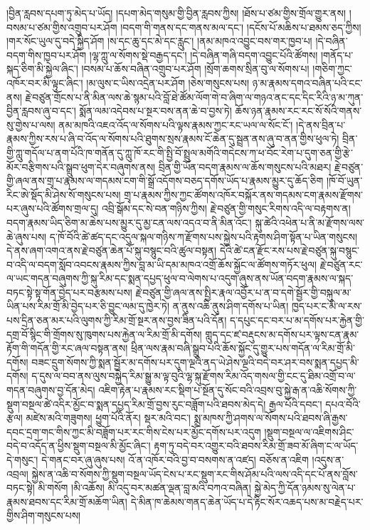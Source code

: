 \documentclass{article}
\begin{document}
།བྱིན་རླབས་དཔག་ཏུ་མེད་པ་ཡོད། །དཔག་མེད་གསུམ་གྱི་བྱིན་རླབས་ཀྱིས། །ཐོས་པ་ཙམ་གྱིས་གྲོལ་གྱུར་ནས། །བསམ་པ་ཙམ་གྱིས་འགྲུབ་པར་ཤོག །བདག་གི་གནས་དང་གནས་མལ་དང་། །དངོས་པོ་མཆིས་པ་ཐམས་ཅད་ཀྱིས། །གར་སོང་ཡུལ་དུ་བདེ་སྐྱིད་ཤོག །ས་དང་ཆུ་དང་མེ་དང་རླུང་། །ནམ་མཁའ་འབྱུང་བས་གར་ཁྱབ་པ། །དེ་བཞིན་བདག་གིས་ཁྱབ་པར་ཤོག །ལྷ་ཀླུ་ལ་སོགས་སྡེ་བརྒྱད་དང་། །དེ་བཞིན་གཞི་བདག་འབྱུང་པོའི་ཚོགས། །གནོད་པ་སྐད་ཅིག་མི་སྐྱེལ་ཞིང་། །བསམ་པ་ཆོས་བཞིན་འགྲུབ་པར་ཤོག །སྲོག་ཆགས་སྲིན་བུ་ལ་སོགས་པ། །གཅིག་ཀྱང་འཁོར་བར་མི་ལྟུང་ཞིང་། །མ་ལུས་ང་ཡིས་འདྲེན་པར་ཤོག །ཅེས་གསུངས་པས། ཉ་མ་རྣམས་དགའ་བཞིན་པའི་ངང་ནས། རྗེ་བཙུན་གྲོངས་པ་ནི་མིན་ལས་ཆེ་སྙམ་པའི་བློ་ཐེ་ཚོམ་ལོག་གེ་བ་ཞིག་ལ་གཉའ་ནང་དང་དིང་རིའི་ཉ་མ་ཀུན་བྱིན་རླབས་ཞུ་བ་དང་། སྨོན་ལམ་འདེབས་པ་སྔར་བས་ནན་ཆེ་བ་བྱས་ཏེ། ཆོས་ཉན་རྣམས་རང་རང་སོ་སོའི་གནས་སུ་གྱེས་པ་ལས། ནམ་མཁའི་འཇའ་འོད་ལ་སོགས་པའི་ལྟས་རྣམས་ཀྱང་རང་ཡལ་ལ་སོང་ངོ་། །དེ་ནས་བྲིན་པ་རྣམས་ཀྱིས་རས་པ་ཞི་བ་འོད་ལ་སོགས་པའི་ཐུགས་སྲས་རྣམས་ངོ་ཆེན་དུ་སྦྲན་ནས་ཞུ་བ་ནན་གྱིས་ཕུལ་ཏེ། བྲིན་གྱི་ཀླུ་གདོལ་པ་ནག་པོའི་ཁ་གནོན་དུ་ཀླུ་ཁོ་རང་གི་སྤྱི་བོ་སྤྲུལ་མགོའི་གདེངས་ཀ་ཕ་བོང་རེག་པ་དུག་ཅན་གྱི་རྩེ་མོར་བརྩིགས་པའི་སྒྲུབ་ཕུག་དེར་བཞུགས་ནས། བྲིན་གྱི་ཡོན་བདག་རྣམས་ལ་ཆོས་གསུངས་པའི་མཐར། རྗེ་བཙུན་གྱི་ཞལ་ནས་གྲྭ་པ་རྣམས་ལ་གདམས་ངག་གི་སྒྲོ་འདོགས་བཅད་དགོས་ཡོད་པ་རྣམས་མྱུར་དུ་ཆོད་ཅིག །ཁོ་བོ་ཡུན་རིང་ཨེ་སྡོད་མི་ཤེས་སོ་གསུངས་པས། གྲྭ་པ་རྣམས་ཀྱིས་ཀྱང་ཚོགས་འཁོར་བསྐོར་ནས་གདམས་ངག་རྣམས་རྫོགས་པར་ཞུས་པའི་ཚོགས་གྲལ་དུ། འབྲི་སྒོམ་དང་སེ་བན་གཉིས་ཀྱིས། རྗེ་བཙུན་གྱི་གསུང་རིགས་འདི་ལ་བརྟགས་ན། བདག་རྣམས་ཡིད་ཅིག་མ་ཆེས་པས་མྱུར་དུ་མྱ་ངན་ལས་འདའ་བ་ནི་མིན་འོང་། སྐུ་ཚེའི་འཕེན་པ་ནི་མ་རྫོགས་ལས་ཆེ་ཞུས་པས། ད་ཁོ་བོའི་ཚེ་ཚད་དང་འདུལ་སྐལ་གཉིས་ཀ་རྫོགས་པས་སྐྱེས་པའི་རྟགས་ཤིག་སྟོན་པ་ཡིན་གསུངས། དེ་ནས་ཞག་འགའ་ནས་རྗེ་བཙུན་ཆེན་པོ་སྐུ་བསྙུང་བའི་ཚུལ་བསྟན། དེའི་ཚེ་ངན་རྫོང་རས་པས་རྗེ་བཙུན་སྐུ་བསྙུང་བ་འདི་ལ་བདག་སློབ་འབངས་རྣམས་ཀྱིས་བླ་མ་ཡི་དམ་མཁའ་འགྲོ་ཆོས་སྐྱོང་ལ་ཚོགས་གཏོར་ཕུལ། རྗེ་བཙུན་རང་ལ་ཡང་གདན་བཞུགས་ཀྱི་སྐུ་རིམ་དང་སྨན་དཔྱད་ཕུལ་བ་ལེགས་པ་འདུག་ཞུས་ནས་ཡོན་བདག་རྣམས་ལ་སྐད་བཏང་སྟེ་སྟ་གོན་བྱེད་པར་བརྩམས་པས། རྗེ་བཙུན་གྱི་ཞལ་ནས་སྤྱིར་རྣལ་འབྱོར་པ་ན་བ་དགེ་སྦྱོར་གྱི་བསྐུལ་མ་ཡིན་པས་རིམ་གྲོ་མི་བྱེད་པར་ཅི་བྱུང་ལམ་དུ་ཁྱེར་ཏེ། ན་ནུས་འཆི་ནུས་ཤིག་དགོས་པ་ཡིན། ཁྱད་པར་ང་མི་ལ་རས་པས་དྲིན་ཅན་མར་པའི་ལུགས་ཀྱི་རིམ་གྲོ་སྔར་ནས་བྱས་ཟིན་པའི་དོན། ད་དཔུང་དང་བར་པ་མ་དགོས་པར་རྐྱེན་གྱི་དགྲ་བོ་སྙིང་གི་གྲོགས་སུ་ཁུགས་པས་རྐྱེན་ལ་རིམ་གྲོ་མི་དགོས། གླུད་དང་ཛ་བརྡུངས་མ་དགོས་པར་ལྟས་ངན་རྣམ་རྟོག་གི་གདོན་གྱི་རང་ཞལ་བསྟན་ནས། ཕྲིན་ལས་རྣམ་བཞི་སྒྲུབ་པའི་ཆོས་སྐྱོང་དུ་གྱུར་པས་གདོན་ལ་རིམ་གྲོ་མི་དགོས། བཟང་དྲུག་སོགས་ཀྱི་སྨན་སྦྱོར་མ་དགོས་པར་དུག་ལྔའི་ནད་ཡེ་ཤེས་ལྔའི་བདེ་བར་ཤར་བས་སྨན་དཔྱད་མི་དགོས། ད་དུས་ལ་བབ་ནས་ལུས་བསྐྱེད་རིམ་སྒྱུ་མ་ལྟ་བུའི་ལྷ་སྐུ་རྫོགས་རིམ་འོད་གསལ་གྱི་ངང་དུ་ཐིམ་འགྲོ་བ་ལ་གདན་བཞུགས་བྱ་དོན་མེད། འཇིག་རྟེན་པ་རྣམས་རང་སྡིག་པ་སྔོན་དུ་སོང་བའི་འབྲས་བུ་སྐྱེ་རྒ་ན་འཆི་སོགས་ཀྱི་སྡུག་བསྔལ་ཚེ་འདིར་མྱོང་བ་སྨན་དཔྱད་རིམ་གྲོ་བྱས་རུང་བཟློག་པའི་ཐབས་མེད་དེ། རྒྱལ་པོའི་དབང་། དཔའ་བོའི་རྩལ། མཛེས་མའི་གཟུགས། ཕྱུག་པོའི་ནོར། སྡར་མའི་བང་། སྨྲ་མཁས་ཀྱི་ཤགས་ལ་སོགས་པའི་ཐབས་ཞི་རྒྱས་དབང་དྲག་གང་གིས་ཀྱང་མི་བཟློག་པར་རང་གིས་ངེས་པར་མྱོང་དགོས་པར་འདུག །སྡུག་བསྔལ་ལ་འཇིགས་ཤིང་བདེ་བ་འདོད་ན་ཕྱིས་སྡུག་བསྔལ་མི་མྱོང་ཞིང་། རྟག་ཏུ་བདེ་བར་འགྱུར་བའི་ཐབས་རིམ་གྲོ་ཟབ་མོ་ཞིག་ང་ལ་ཡོད་དེ་གསུང་། དེ་གནང་བར་ཞུ་ཞུས་པས། འོ་ན་འཁོར་བའི་བྱ་བ་བསགས་ན་འཛད། བཅོས་ན་འཇིག །འདུས་ན་འབྲལ། སྐྱེས་ན་འཆི་བ་སོགས་ཀྱི་སྡུག་བསྔལ་ཡོད་ངེས་པ་རང་སྡུག་རང་གིས་ཤོམ་པའི་ལས་འདི་དང་པོ་ནས་བློས་བཏང་སྟེ། མི་གསོག །མི་འཆོས། མི་འདུ་བར་མཚན་ལྡན་བླ་མའི་བཀའ་བཞིན། སྐྱེ་མེད་ཀྱི་དོན་ཉམས་སུ་ལེན་པ་རྣམས་ཐབས་དང་རིམ་གྲོ་མཆོག་ཡིན། དེ་མིན་ཁ་ཆེམས་གནད་ཆེན་ཡོད་པ་དེ་རྟིང་སོར་འཆད་པས་མ་བརྗེད་པར་གྱིས་ཤིག་གསུངས་པས། 
\end{document}
